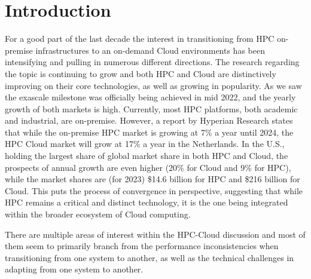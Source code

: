 \section{Introduction}

For a good part of the last decade the interest in transitioning from HPC on-premise infrastructures to an on-demand Cloud environments has been intensifying and pulling in numerous different directions. The research regarding the topic is continuing to grow and  both HPC and Cloud are distinctively improving on their core technologies, as well as growing in popularity. As we saw the exascale milestone was officially being achieved in mid 2022, and the yearly growth of both markets is high. Currently, most HPC platforms, both academic and industrial, are on-premise. However, a report by Hyperian Research states that while the on-premise HPC market is growing at 7\% a year until 2024, the HPC Cloud market will grow at 17\% a year \cite{silva_review_2024} in the Netherlands. In the U.S., holding the largest share of global market share in both HPC and Cloud, the prospects of annual growth are even higher (20\% for Cloud and 9\% for HPC), while the market shares are (for 2023) \$14.6 billion for HPC and \$216 billion for Cloud. This puts the process of convergence in perspective, suggesting that while HPC remains a critical and distinct technology, it is the one being integrated within the broader ecosystem of Cloud computing.



There are multiple areas of interest within the HPC-Cloud discussion and most of them seem to primarily branch from the performance inconsistencies when transitioning from one system to another, as well as the technical challenges in adapting from one system to another.

